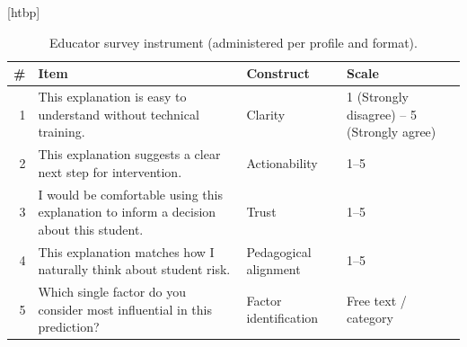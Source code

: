 \begin{table}
\small[htbp]
\caption{Educator survey instrument (administered per profile and format).}
\label{tab:A09_survey_instrument}
\begin{tabular}{rlll}
\toprule
\# & Item & Construct & Scale \\
\midrule
1 & This explanation is easy to understand without technical training. & Clarity & 1 (Strongly disagree) – 5 (Strongly agree) \\
2 & This explanation suggests a clear next step for intervention. & Actionability & 1–5 \\
3 & I would be comfortable using this explanation to inform a decision about this student. & Trust & 1–5 \\
4 & This explanation matches how I naturally think about student risk. & Pedagogical alignment & 1–5 \\
5 & Which single factor do you consider most influential in this prediction? & Factor identification & Free text / category \\
\bottomrule
\end{tabular}
\end{table}
